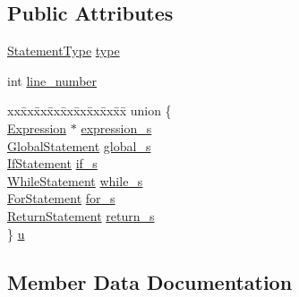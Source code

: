 \subsection*{Public Attributes}
\begin{DoxyCompactItemize}
\item 
\hyperlink{crowbar_8h_a5f5d0dfd807d2356ecc3cdabf71b3d53}{Statement\+Type} \hyperlink{struct_statement__tag_abe1b2488e3a8c4277078f8c1b7c86482}{type}
\item 
int \hyperlink{struct_statement__tag_a96dcb197dafe54cf45fcf2d5123f7ab3}{line\+\_\+number}
\item 
\begin{tabbing}
xx\=xx\=xx\=xx\=xx\=xx\=xx\=xx\=xx\=\kill
union \{\\
\>\hyperlink{crowbar_8h_a070c6feb370aad8a9665ca315bf6ed4a}{Expression} $\ast$ \hyperlink{struct_statement__tag_abb838fa3163c91f43a36d1ba87674c87}{expression\_s}\\
\>\hyperlink{struct_global_statement}{GlobalStatement} \hyperlink{struct_statement__tag_a0a05cf3ddbe6aa28a52c97cb17aebc53}{global\_s}\\
\>\hyperlink{struct_if_statement}{IfStatement} \hyperlink{struct_statement__tag_a0e4d01f350eb7ea2e195c82638d38ec4}{if\_s}\\
\>\hyperlink{struct_while_statement}{WhileStatement} \hyperlink{struct_statement__tag_ad897c318f35e7476a81dcf1eb2275f89}{while\_s}\\
\>\hyperlink{struct_for_statement}{ForStatement} \hyperlink{struct_statement__tag_a3299f7bafe47d4b9a2ab4a23f30de671}{for\_s}\\
\>\hyperlink{struct_return_statement}{ReturnStatement} \hyperlink{struct_statement__tag_afe3a97a689d2ac59f84600f220cdad1e}{return\_s}\\
\} \hyperlink{struct_statement__tag_a33748df145380d0099e0941d3c937265}{u}\\

\end{tabbing}\end{DoxyCompactItemize}


\subsection{Member Data Documentation}
\hypertarget{struct_statement__tag_abb838fa3163c91f43a36d1ba87674c87}{}
